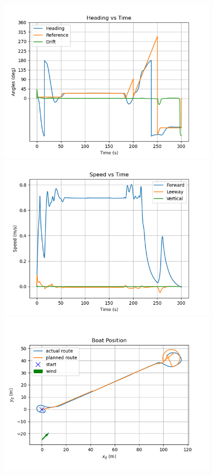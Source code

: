 \documentclass[conference]{IEEEtran}
\begin{document}
\begin{figure}
    \centering
    \includegraphics[trim={0.5cm 0.25cm 1.25cm 0.75cm },clip]{documents/final_pres_figs/with_wind_to_40_40_heading.png}
    \includegraphics[trim={0.5cm 0.25cm 1.25cm 0.75cm },clip]{documents/final_pres_figs/with_wind_to_40_40_speed.png}
    \includegraphics[trim={0.5cm 1cm 1.25cm 1.5cm },clip]{documents/final_pres_figs/with_wind_to_40_40_pos.png}

\end{figure}
\end{document}

